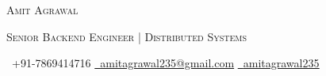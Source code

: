   
{\centering
    { \Huge \scshape Amit Agrawal\par}
    { \scshape Senior Backend Engineer | Distributed Systems\par} 
    \vspace{4pt}
    \small \raisebox{-0.1\height}\faPhone\ +91{-}7869414716 
    \quad\textbar\quad \href{mailto:amitagrawal235@gmail.com}{\raisebox{-0.2\height}\faEnvelope\  \underline{amitagrawal235@gmail.com}} 
    \quad\textbar\quad \href{https://linkedin.com/in/amitagrawal235/}{\raisebox{-0.2\height}\faLinkedin\ \underline{amitagrawal235}}
    \par
}
